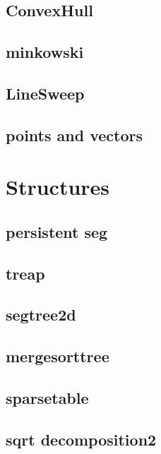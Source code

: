\subsection{ConvexHull}
\raggedbottom
\hrulefill
\subsection{minkowski}
\raggedbottom
\hrulefill
\subsection{LineSweep}
\raggedbottom
\hrulefill
\subsection{points and vectors}
\raggedbottom
\hrulefill

\section{Structures}
\subsection{persistent seg}
\raggedbottom
\hrulefill
\subsection{treap}
\raggedbottom
\hrulefill
\subsection{segtree2d}
\raggedbottom
\hrulefill
\subsection{mergesorttree}
\raggedbottom
\hrulefill
\subsection{sparsetable}
\raggedbottom
\hrulefill
\subsection{sqrt decomposition2}
\raggedbottom
\hrulefill
